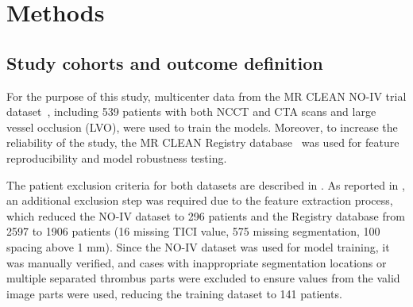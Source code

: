 \documentclass[preprint,12pt]{elsarticle}
\begin{document}











\section{Methods}

\subsection{Study cohorts and outcome definition}


For the purpose of this study, multicenter data from the MR CLEAN NO-IV trial dataset~\cite{Jansen2018}, including 539 patients with both NCCT and CTA scans and large vessel occlusion (LVO), were used to train the models. Moreover, to increase the reliability of the study, the MR CLEAN Registry database~\cite{IvoGHJansen20180309} was used for feature reproducibility and model robustness testing. 


The patient exclusion criteria for both datasets are described in \cite{Mojtahedi2024}. As reported in \cite{Nemcekova2025}, an additional exclusion step was required due to the feature extraction process, which reduced the NO-IV dataset to 296 patients and the Registry database from 2597 to 1906 patients (16 missing TICI value, 575 missing segmentation, 100 spacing above 1 mm). Since the NO-IV dataset was used for model training, it was manually verified, and cases with inappropriate segmentation locations or multiple separated thrombus parts were excluded to ensure values from the valid image parts were used, reducing the training dataset to 141 patients. 
\end{document}
